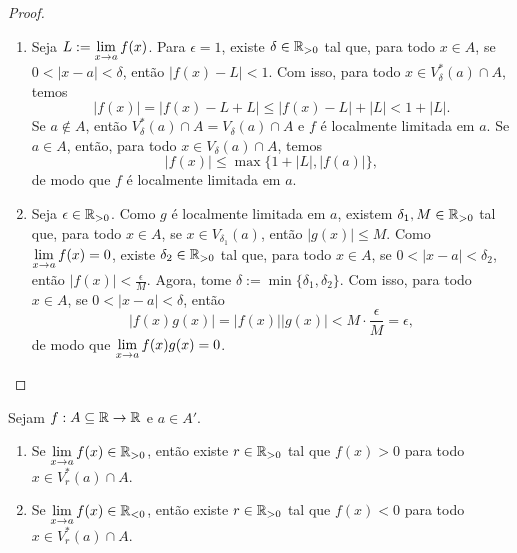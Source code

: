 \begin{proof}
    \leavevmode
        \begin{enumerate}[leftmargin=*, align=left, label=\textbf{(\alph*)}]
            \item Seja $\displaystyle L := \lim_{x \to a} f(x)$. Para $\epsilon = 1$, existe $\delta \in \mathbb{R}_{>0}$ tal que, para todo $x \in A$, se $0 < |x-a| < \delta$, então $|f(x) - L| < 1$. Com isso, para todo $x \in V^*_{\delta}(a) \cap A$, temos
                \[
                    |f(x)| = |f(x) - L + L| \leq |f(x)-L| + |L| < 1 + |L|.
                \]
            Se $a \notin A$, então $V^*_{\delta}(a) \cap A = V_{\delta}(a) \cap A$ e $f$ é localmente limitada em $a$. Se $a \in A$, então, para todo $x \in V_{\delta}(a) \cap A$, temos
                \[
                    |f(x)| \leq \max \{ 1+|L|, |f(a)| \},
                \]
            de modo que $f$ é localmente limitada em $a$. \blackproof
            \item Seja $\epsilon \in \mathbb{R}_{>0}$. Como $g$ é localmente limitada em $a$, existem $\delta_1, M \in \mathbb{R}_{>0}$ tal que, para todo $x \in A$, se $x \in V_{\delta_1}(a)$, então $|g(x)| \leq M$. Como $\displaystyle \lim_{x \to a} f(x) = 0$, existe $\delta_2 \in \mathbb{R}_{>0}$ tal que, para todo $x \in A$, se $0<|x-a|<\delta_2$, então $|f(x)| < \frac{\epsilon}{M}$. Agora, tome $\delta := \min \{\delta_1, \delta_2\}$. Com isso, para todo $x \in A$, se $0<|x-a|<\delta$, então
                \[
                    |f(x) g(x)| = |f(x)| |g(x)| < M \cdot \dfrac{\epsilon}{M} = \epsilon,
                \]
            de modo que $\displaystyle \lim_{x \to a} f(x) g(x) = 0$. \blackproof
        \end{enumerate}
\end{proof}

\begin{proposition}
    Sejam $f : A \subseteq \mathbb{R} \to \mathbb{R}$ e $a \in A'$.
        \begin{enumerate}[leftmargin=*, align=left, label=\textbf{(\alph*)}]
            \item Se $\displaystyle \lim_{x \to a} f(x) \in \mathbb{R}_{>0}$, então existe $r \in \mathbb{R}_{>0}$ tal que $f(x) > 0$ para todo $x \in V^*_{r}(a) \cap A$.
            \item Se $\displaystyle \lim_{x \to a} f(x) \in \mathbb{R}_{<0}$, então existe $r \in \mathbb{R}_{>0}$ tal que $f(x) < 0$ para todo $x \in V^*_{r}(a) \cap A$.
        \end{enumerate}
\end{proposition}

